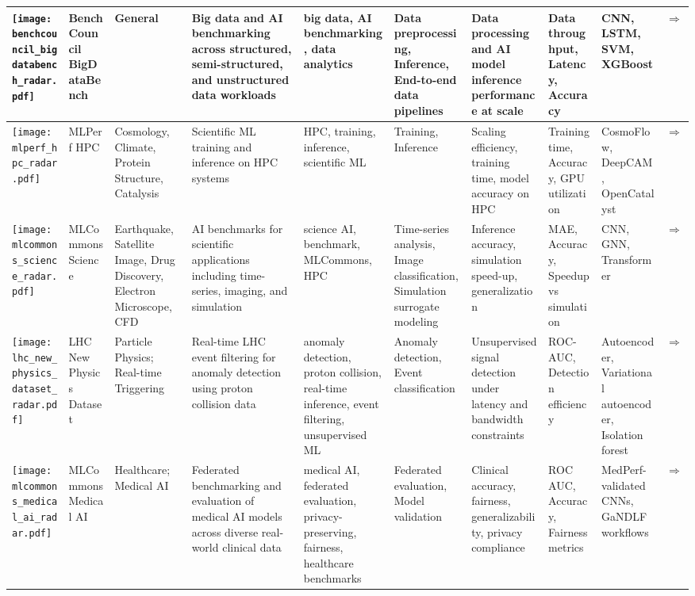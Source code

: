 \begin{landscape}
{\begin{longtable}{|p{}|p{}|p{}|p{}|p{}|p{}|p{}|p{}|p{}|p{}|}
\texttt{[image: benchcouncil\_bigdatabench\_radar.pdf]} & BenchCouncil BigDataBench & General & Big data and AI benchmarking across structured, semi-structured, and unstructured data workloads & big data, AI benchmarking, data analytics & Data preprocessing, Inference, End-to-end data pipelines & Data processing and AI model inference performance at scale & Data throughput, Latency, Accuracy & CNN, LSTM, SVM, XGBoost & \cite{gao2018bigdatabenchscalableunifiedbig}\href{https://www.benchcouncil.org/BigDataBench/}{$\Rightarrow$} \\ \hline
\texttt{[image: mlperf\_hpc\_radar.pdf]} & MLPerf HPC & Cosmology, Climate, Protein Structure, Catalysis & Scientific ML training and inference on HPC systems & HPC, training, inference, scientific ML & Training, Inference & Scaling efficiency, training time, model accuracy on HPC & Training time, Accuracy, GPU utilization & CosmoFlow, DeepCAM, OpenCatalyst & \cite{farrell2021mlperfhpcholisticbenchmark}\href{https://github.com/mlcommons/hpc}{$\Rightarrow$} \\ \hline
\texttt{[image: mlcommons\_science\_radar.pdf]} & MLCommons Science & Earthquake, Satellite Image, Drug Discovery, Electron Microscope, CFD & AI benchmarks for scientific applications including time-series, imaging, and simulation & science AI, benchmark, MLCommons, HPC & Time-series analysis, Image classification, Simulation surrogate modeling & Inference accuracy, simulation speed-up, generalization & MAE, Accuracy, Speedup vs simulation & CNN, GNN, Transformer & \cite{10.1007/978-3-031-23220-6_4}\href{https://github.com/mlcommons/science}{$\Rightarrow$} \\ \hline
\texttt{[image: lhc\_new\_physics\_dataset\_radar.pdf]} & LHC New Physics Dataset & Particle Physics; Real-time Triggering & Real-time LHC event filtering for anomaly detection using proton collision data & anomaly detection, proton collision, real-time inference, event filtering, unsupervised ML & Anomaly detection, Event classification & Unsupervised signal detection under latency and bandwidth constraints & ROC-AUC, Detection efficiency & Autoencoder, Variational autoencoder, Isolation forest & \cite{https://doi.org/10.5281/zenodo.5046389}\href{https://arxiv.org/pdf/2107.02157}{$\Rightarrow$} \\ \hline
\texttt{[image: mlcommons\_medical\_ai\_radar.pdf]} & MLCommons Medical AI & Healthcare; Medical AI & Federated benchmarking and evaluation of medical AI models across diverse real-world clinical data & medical AI, federated evaluation, privacy-preserving, fairness, healthcare benchmarks & Federated evaluation, Model validation & Clinical accuracy, fairness, generalizability, privacy compliance & ROC AUC, Accuracy, Fairness metrics & MedPerf-validated CNNs, GaNDLF workflows & \cite{karargyris2023federated}\href{https://github.com/mlcommons/medical}{$\Rightarrow$} \\ \hline

\end{longtable}}
\end{landscape}
